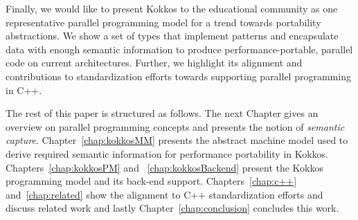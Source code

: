 Finally, we would like to present Kokkos to the educational community as one representative parallel programming model for a trend towards portability abstractions. We show a set of types that implement patterns and encapsulate data with enough semantic information to produce performance-portable, parallel code on current architectures. Further, we highlight its alignment and contributions to standardization efforts towards supporting parallel programming in C++.

The rest of this paper is structured as follows. The next Chapter gives an overview on parallel programming concepts and presents the notion of \emph{semantic capture}. Chapter~\ref{chap:kokkosMM} presents the abstract machine model used to derive required semantic information for performance portability in Kokkos. Chapters~\ref{chap:kokkosPM} and ~\ref{chap:kokkosBackend} present the Kokkos programming model and its back-end support. Chapters~\ref{chap:c++} and~\ref{chap:related} show the alignment to C++ standardization efforts and discuss related work and lastly Chapter~\ref{chap:conclusion} concludes this work.

